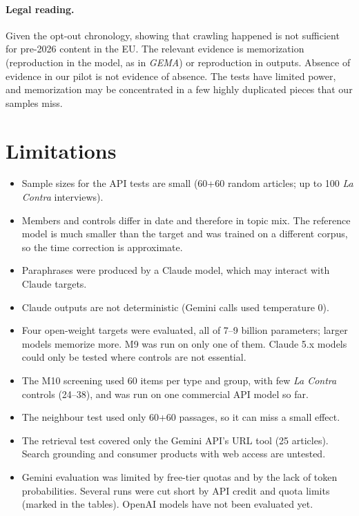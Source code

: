 \documentclass[10pt,a4paper]{article}
\begin{document}
\paragraph{Legal reading.} Given the opt-out chronology, showing that crawling happened is not sufficient for pre-2026
content in the EU. The relevant evidence is memorization (reproduction in the model, as in \emph{GEMA}) or
reproduction in outputs. Absence of evidence in our pilot is not evidence of absence. The tests have limited power,
and memorization may be concentrated in a few highly duplicated pieces that our samples miss.

\section{Limitations}
\begin{itemize}
\item Sample sizes for the API tests are small (60+60 random articles; up to 100 \emph{La Contra} interviews).
\item Members and controls differ in date and therefore in topic mix. The reference model is much smaller than the
target and was trained on a different corpus, so the time correction is approximate.
\item Paraphrases were produced by a Claude model, which may interact with Claude targets.
\item Claude outputs are not deterministic (Gemini calls used temperature 0).
\item Four open-weight targets were evaluated, all of 7--9 billion parameters; larger models memorize more. M9 was
run on only one of them. Claude
5.x models could only be tested where controls are not essential.
\item The M10 screening used 60 items per type and group, with few \emph{La Contra} controls (24--38), and
was run on one commercial API model so far.
\item The neighbour test used only 60+60 passages, so it can miss a small effect.
\item The retrieval test covered only the Gemini API's URL tool (25 articles). Search grounding and consumer
products with web access are untested.
\item Gemini evaluation was limited by free-tier quotas and by the lack of token probabilities. Several runs were cut
short by API credit and quota limits (marked in the tables). OpenAI models have not been evaluated yet.
\end{itemize}
\end{document}
